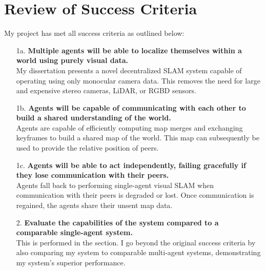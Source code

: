 

\label{sec:4}

\section{Review of Success Criteria}
\label{sec:review-of-success-criteria}
My project has met all success criteria as outlined below:

\begin{enumerate}[font=\bfseries]
    \item[1a.]\textbf{Multiple agents will be able to localize themselves within a world using purely visual data.} \\
    My dissertation presents a novel decentralized SLAM system capable of operating using only monocular camera data. This removes the need for large and expensive stereo cameras, LiDAR, or RGBD sensors.

    \item[1b.]\textbf{Agents will be capable of communicating with each other to build a shared understanding of the world.} \\
    Agents are capable of efficiently computing map merges and exchanging keyframes to build a shared map of the world. This map can subsequently be used to provide the relative position of peers.

    \item[1c.]\textbf{Agents will be able to act independently, failing gracefully if they lose communication with their peers.} \\
    Agents fall back to performing single-agent visual SLAM when communication with their peers is degraded or lost. Once communication is regained, the agents share their unsent map data.

    \item[2.]\textbf{Evaluate the capabilities of the system compared to a comparable single-agent system.} \\
    This is performed in the  section. I go beyond the original success criteria by also comparing my system to comparable multi-agent systems, demonstrating my system's superior performance.

\end{enumerate}

